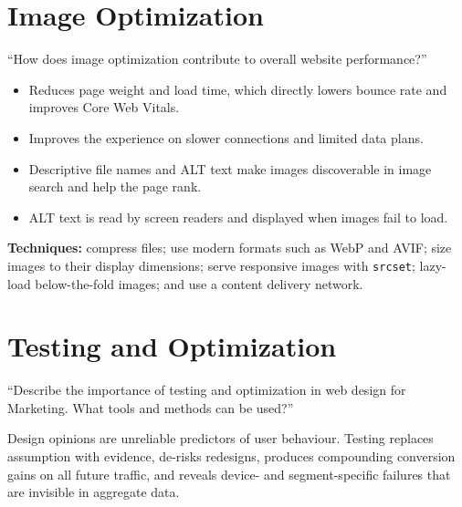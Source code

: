 \documentclass{MMTextbook}
\begin{document}
\section{Image Optimization}

\begin{exambox}
``How does image optimization contribute to overall website performance?''
\begin{itemize}
\item {} Reduces page weight and load time, which directly lowers
      bounce rate and improves Core Web Vitals.
\item {} Improves the experience on slower connections and limited
      data plans.
\item {} Descriptive file names and ALT text make images discoverable in
      image search and help the page rank.
\item {} ALT text is read by screen readers and displayed when
      images fail to load.
\end{itemize}
\end{exambox}

\noindent\textbf{Techniques:} compress files; use modern formats such as WebP and
AVIF; size images to their display dimensions; serve responsive images with
\texttt{srcset}; lazy-load below-the-fold images; and use a content delivery
network.

\section{Testing and Optimization}

\begin{keybox}
``Describe the importance of testing and optimization in web design for
Marketing. What tools and methods can be used?''
\end{keybox}

\begin{keybox}
Design opinions are unreliable predictors of user behaviour. Testing replaces
assumption with evidence, de-risks redesigns, produces compounding conversion
gains on all future traffic, and reveals device- and segment-specific failures
that are invisible in aggregate data.
\end{keybox}
\end{document}
